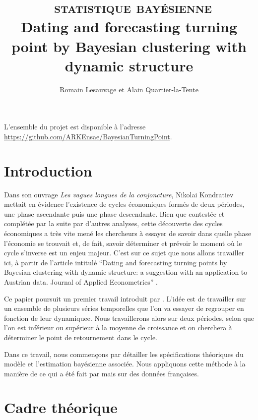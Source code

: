 \documentclass[10pt,french,french]{article}
\title{~\textsc{statistique bayésienne}\\
\hspace*{0.333em}Dating and forecasting turning point by Bayesian clustering with dynamic structure}
\author{Romain Lesauvage et Alain Quartier-la-Tente}
\date{}
\begin{document}
\maketitle




{
\hypersetup{linkcolor=black}
\setcounter{tocdepth}{2}
\tableofcontents
}
\vfill

L'ensemble du projet est disponible à l'adresse \url{https://github.com/ARKEnsae/BayesianTurningPoint}.

\newpage

\hypertarget{introduction}{%
\section{Introduction}\label{introduction}}

Dans son ouvrage \emph{Les vagues longues de la conjoncture}, Nikolai Kondratiev mettait en évidence l'existence de cycles économiques formés de deux périodes, une phase ascendante puis une phase descendante.
Bien que contestée et complétée par la suite par d'autres analyses, cette découverte des cycles économiques a très vite mené les chercheurs à essayer de savoir dans quelle phase l'économie se trouvait et, de fait, savoir déterminer et prévoir le moment où le cycle s'inverse est un enjeu majeur.
C'est sur ce sujet que nous allons travailler ici, à partir de l'article intitulé ``Dating and forecasting turning points by Bayesian clustering with dynamic structure: a suggestion with an application to Austrian data. Journal of Applied Econometrics'' \cite{Kaufmann}.

Ce papier poursuit un premier travail introduit par \cite{FruhwirthKaufmann}.
L'idée est de travailler sur un ensemble de plusieurs séries temporelles que l'on va essayer de regrouper en fonction de leur dynamiquee.
Nous travaillerons alors sur deux périodes, selon que l'on est inférieur ou supérieur à la moyenne de croissance et on cherchera à déterminer le point de retournement dans le cycle.

Dans ce travail, nous commençons par détailler les spécifications théoriques du modèle et l'estimation bayésienne associée.
Nous appliquons cette méthode à la manière de ce qui a été fait par \cite{Kaufmann} mais sur des données françaises.

\hypertarget{cadre-thuxe9orique}{%
\section{Cadre théorique}\label{cadre-thuxe9orique}}
\end{document}
